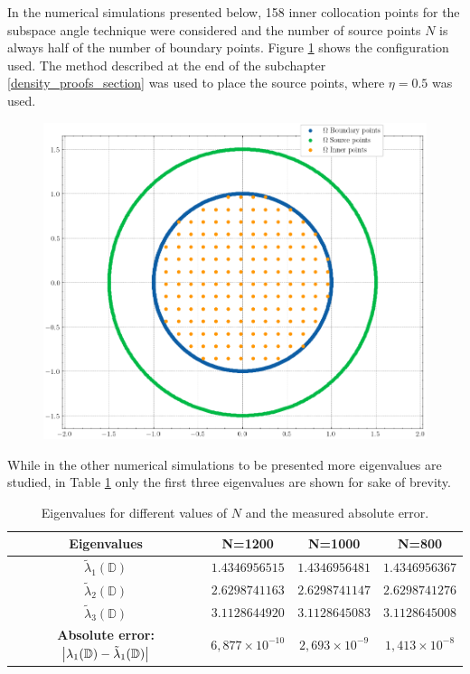 In the numerical simulations presented below, 158 inner collocation points for the subspace angle technique were considered and the number of source points \(N\) is always half of the number of boundary points. Figure \ref{dirak_disk_col_m0} shows the configuration used. The method described at the end of the subchapter \ref{density_proofs_section} was used to place the source points, where \(\eta=0.5\) was used. 

\begin{figure}[!htb]
    \centering
    \includegraphics[width=0.5\linewidth]{Images/Dirac/circle_m_0_col_points_158_inner_eta_05.png}
    \label{dirak_disk_col_m0}
\end{figure}

While in the other numerical simulations to be presented more eigenvalues are studied, in Table \ref{tab:eigenvalues_disk_val} only the first three eigenvalues are shown for sake of brevity.

\begin{table}[htbp]
    \centering
    \begin{tabular}{cccc}
        \toprule
        \textbf{Eigenvalues} & \textbf{N=1200} & \textbf{N=1000} & \textbf{N=800} \\
        \midrule
        \(\tilde{\lambda}_1(\mathbb{D})\) & $1.4346956515$ & $1.4346956481$ & $1.4346956367$ \\
        \(\tilde{\lambda}_2(\mathbb{D})\) & $2.6298741163$ & $2.6298741147$ & $2.6298741276$ \\
        \(\tilde{\lambda}_3(\mathbb{D})\) & $3.1128644920$ & $3.1128645083$ & $3.1128645008$ \\
        \midrule
        \textbf{Absolute error: } \(\abs{\lambda_1(\mathbb{D}) - \tilde{\lambda}_1(\mathbb{D})}\) & $6,877\times 10^{-10}$ & $2,693\times 10^{-9}$ & $1,413\times 10^{-8}$ \\
        \bottomrule
    \end{tabular}
    \caption{Eigenvalues for different values of \(N\) and the measured absolute error.}
    \label{tab:eigenvalues_disk_val}
\end{table}

